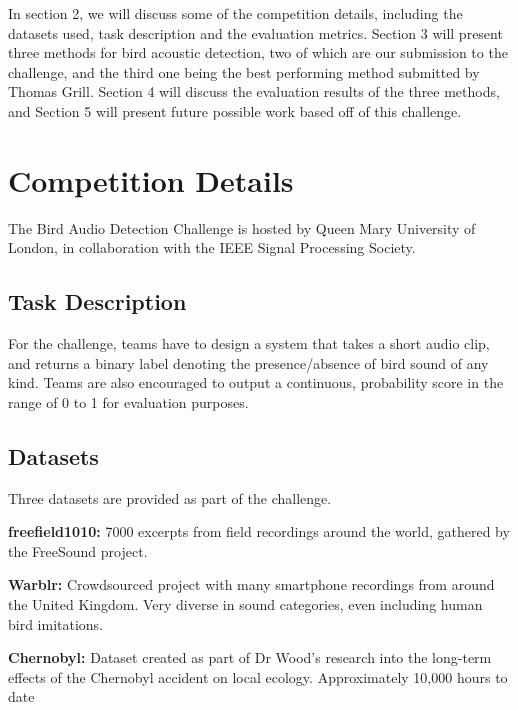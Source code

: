 \documentclass[10pt,twocolumn,letterpaper]{article}
\begin{document}
In section 2, we will discuss some of the competition details, including
the datasets used, task description and the evaluation metrics. Section 3
will present three methods for bird acoustic detection, two of which are
our submission to the challenge, and the third one being the best
performing method submitted by Thomas Grill. Section 4 will discuss the
evaluation results of the three methods, and Section 5 will present future
possible work based off of this challenge.

\section{Competition Details}

The Bird Audio Detection Challenge is hosted by Queen Mary University of
London, in collaboration with the IEEE Signal Processing Society. 

\subsection{Task Description}

For the challenge, teams have to design a system that takes a short audio
clip, and returns a binary label denoting the presence/absence of bird
sound of any kind. Teams are also encouraged to output a continuous,
probability score in the range of 0 to 1 for evaluation purposes.

\subsection{Datasets}

Three datasets are provided as part of the challenge.

\textbf{freefield1010:} 7000 excerpts from field recordings around the
world, gathered by the FreeSound project.

\textbf{Warblr:} Crowdsourced project with many smartphone recordings from
around the United Kingdom. Very diverse in sound categories, even including
human bird imitations.

\textbf{Chernobyl:} Dataset created as part of Dr Wood's research into the
long-term effects of the Chernobyl accident on local ecology. Approximately
10,000 hours to date
\end{document}
